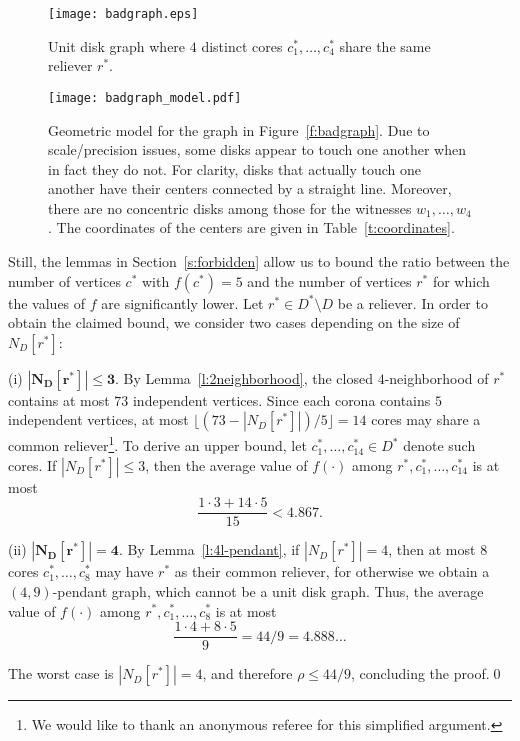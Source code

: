 \documentclass[preprint,12pt]{elsarticle}
\begin{document}
\begin{pf}
\begin{figure}[t!]
 \centering
 \texttt{[image: badgraph.eps]}
 \caption{\label{f:badgraph} Unit disk graph where $4$ distinct cores $c^*_1,\ldots,c^*_4$ share the same reliever $r^*$.}
\bigskip
\bigskip
\bigskip
 \centering
 \texttt{[image: badgraph\_model.pdf]}
 \caption{\label{f:badgraph_model} Geometric model for the graph in Figure~\ref{f:badgraph}. Due to scale/precision issues, some disks appear to touch one another when in fact they do not. For clarity, disks that actually touch one another have their centers connected by a straight line. Moreover, there are no concentric disks among those for the witnesses $w_1, \ldots, w_4$. The coordinates of the centers are given in Table~\ref{t:coordinates}.}  
\end{figure}
 
Still, the lemmas in Section~\ref{s:forbidden} allow us to bound the ratio between the number of vertices $c^*$ with $f(c^*) = 5$ and the number of vertices $r^*$ for which the values of $f$ are significantly lower. Let $r^* \in D^*\setminus D$ be a reliever. In order to obtain the claimed bound, we consider two cases depending on the size \linebreak of $N_D[r^*]$:

\smallskip

(i) $\boldsymbol{|N_D[r^*]| \leq 3.}$ By Lemma~\ref{l:2neighborhood}, the closed $4$-neighborhood of $r^*$ contains at most $73$ independent vertices. Since each corona contains $5$ independent vertices, at most $\lfloor (73 - |N_D[r^*]|)/5 \rfloor = 14$ cores may share a common reliever\footnote{We would like to thank an anonymous referee for this simplified argument.}. To derive an upper bound, let $c^*_1,\ldots,c^*_{14} \in D^*$ denote such cores. If $|N_D[r^*]| \leq 3$, then the average value of $f(\cdot)$ among $r^*,c^*_1,\ldots,c^*_{14}$ is at most
 $$\frac{1 \cdot 3 + 14 \cdot 5}{15} < 4{.}867.$$

(ii) $\boldsymbol{|N_D[r^*]| = 4.}$ By Lemma~\ref{l:4l-pendant}, if $|N_D[r^*]| = 4$, then at most $8$ cores $c^*_1, \ldots,c^*_8$ may have $r^*$ as their common reliever, for otherwise we obtain \linebreak a $(4,9)$-pendant graph, which cannot be a unit disk graph. Thus, the average value of $f(\cdot)$ among $r^*,c^*_1,\ldots,c^*_8$ is at most
$$\frac{1 \cdot 4 + 8 \cdot 5}{9} = 44/9 = 4.888\ldots$$

The worst case is $|N_D[r^*]| = 4$, and therefore $\rho \leq 44/9$, concluding the proof.\qed
\end{pf}
\end{document}
